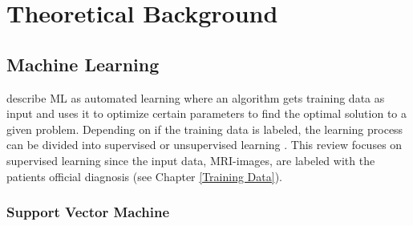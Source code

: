 \section{Theoretical Background}










\subsection{Machine Learning}
\textcite{shalevbook} describe \gls{ML} as automated learning where an algorithm gets training data as input and uses it to optimize certain parameters to find the optimal solution to a given problem. Depending on if the training data is labeled, the learning process can be divided into supervised or unsupervised learning \autocite{shalevbook}. This review focuses on supervised learning since the input data, MRI-images, are labeled with the patients official diagnosis (see Chapter \ref{Training Data}). 


\subsubsection{Support Vector Machine} \label{Support Vector Machine}

